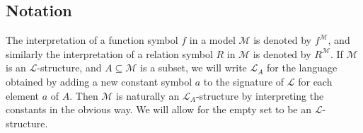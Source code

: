 \subsection{Notation}
The interpretation of a function symbol \( f \) in a model \( \mathcal M \) is denoted by \( f^{\mathcal M} \), and similarly the interpretation of a relation symbol \( R \) in \( \mathcal M \) is denoted by \( R^{\mathcal M} \).
If \( \mathcal M \) is an \( \mathcal L \)-structure, and \( A \subseteq \mathcal M \) is a subset, we will write \( \mathcal L_A \) for the language obtained by adding a new constant symbol \( a \) to the signature of \( \mathcal L \) for each element \( a \) of \( A \).
Then \( \mathcal M \) is naturally an \( \mathcal L_A \)-structure by interpreting the constants in the obvious way.
We will allow for the empty set to be an \( \mathcal L \)-structure.

